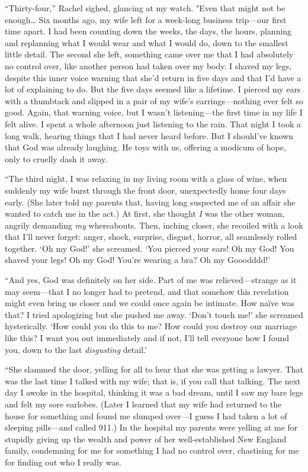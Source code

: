 ``Thirty-four,'' Rachel sighed, glancing at my watch. "Even that might
not be enough\ldots{} Six months ago, my wife left for a week-long
business trip---our first time apart. I had been counting down the
weeks, the days, the hours, planning and replanning what I would wear
and what I would do, down to the smallest little detail. The second she
left, something came over me that I had absolutely no control over, like
another person had taken over my body. I shaved my legs, despite this
inner voice warning that she'd return in five days and that I'd have a
lot of explaining to do. But the five days seemed like a lifetime. I
pierced my ears with a thumbtack and slipped in a pair of my wife's
earrings---nothing ever felt so good. Again, that warning voice, but I
wasn't listening---the first time in my life I felt alive. I spent a
whole afternoon just listening to the rain. That night I took a long
walk, hearing things that I had never heard before. But I should've
known that God was already laughing. He toys with us, offering a modicum
of hope, only to cruelly dash it away.

``The third night, I was relaxing in my living room with a glass of wine,
when suddenly my wife burst through the front door, unexpectedly home
four days early. (She later told my parents that, having long suspected
me of an affair she wanted to catch me in the act.) At first, she
thought \emph{I} was the other woman, angrily demanding \emph{my}
whereabouts. Then, inching closer, she recoiled with a look that I'll
never forget: anger, shock, surprise, disgust, horror, all seamlessly
rolled together. `Oh my God!' she screamed. `You pierced your ears! Oh
my God! You shaved your legs! Oh my God! You're wearing a bra? Oh my
Gooodddd!'

``And yes, God was definitely on her side. Part of me was
relieved---strange as it may seem---that I no longer had to pretend, and
that somehow this revelation might even bring us closer and we could
once again be intimate. How naïve was that? I tried apologizing but she
pushed me away. `Don't touch me!' she screamed hysterically. `How could
you do this to me? How could you destroy our marriage like this? I want
you out immediately and if not, I'll tell everyone how I found you, down
to the last \emph{disgusting} detail.'

``She slammed the door, yelling for all to hear that she was getting a
lawyer. That was the last time I talked with my wife; that is, if you
call that talking. The next day I awoke in the hospital, thinking it was
a bad dream, until I saw my bare legs and felt my sore earlobes. (Later
I learned that my wife had returned to the house for something and found
me slumped over---I guess I had taken a lot of sleeping pills---and
called 911.) In the hospital my parents were yelling at me for stupidly
giving up the wealth and power of her well-established New England
family, condemning for me for something I had no control over,
chastising for me for finding out who I really was.

